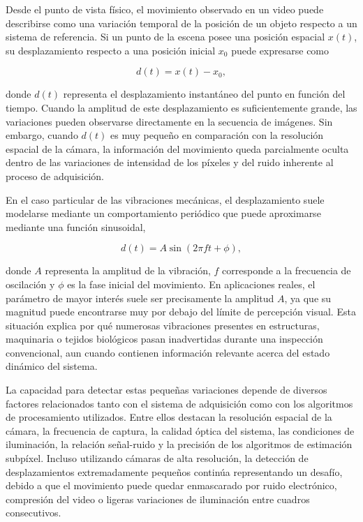 Desde el punto de vista físico, el movimiento observado en un video puede describirse como una variación temporal de la posición de un objeto respecto a un sistema de referencia. Si un punto de la escena posee una posición espacial $x(t)$, su desplazamiento respecto a una posición inicial $x_0$ puede expresarse como

\begin{equation}
d(t)=x(t)-x_0,
\end{equation}

donde $d(t)$ representa el desplazamiento instantáneo del punto en función del tiempo. Cuando la amplitud de este desplazamiento es suficientemente grande, las variaciones pueden observarse directamente en la secuencia de imágenes. Sin embargo, cuando $d(t)$ es muy pequeño en comparación con la resolución espacial de la cámara, la información del movimiento queda parcialmente oculta dentro de las variaciones de intensidad de los píxeles y del ruido inherente al proceso de adquisición.

En el caso particular de las vibraciones mecánicas, el desplazamiento suele modelarse mediante un comportamiento periódico que puede aproximarse mediante una función sinusoidal,

\begin{equation}
d(t)=A\sin(2\pi ft+\phi),
\end{equation}

donde $A$ representa la amplitud de la vibración, $f$ corresponde a la frecuencia de oscilación y $\phi$ es la fase inicial del movimiento. En aplicaciones reales, el parámetro de mayor interés suele ser precisamente la amplitud $A$, ya que su magnitud puede encontrarse muy por debajo del límite de percepción visual. Esta situación explica por qué numerosas vibraciones presentes en estructuras, maquinaria o tejidos biológicos pasan inadvertidas durante una inspección convencional, aun cuando contienen información relevante acerca del estado dinámico del sistema.

La capacidad para detectar estas pequeñas variaciones depende de diversos factores relacionados tanto con el sistema de adquisición como con los algoritmos de procesamiento utilizados. Entre ellos destacan la resolución espacial de la cámara, la frecuencia de captura, la calidad óptica del sistema, las condiciones de iluminación, la relación señal-ruido y la precisión de los algoritmos de estimación subpíxel. Incluso utilizando cámaras de alta resolución, la detección de desplazamientos extremadamente pequeños continúa representando un desafío, debido a que el movimiento puede quedar enmascarado por ruido electrónico, compresión del video o ligeras variaciones de iluminación entre cuadros consecutivos.

